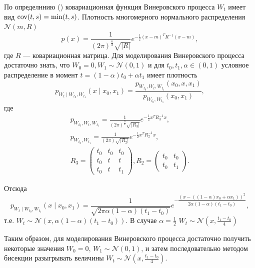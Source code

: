     По определннию (\cite{SAIM}) ковариационная функция Винеровского процесса 
    $W_t$ имеет вид $\operatorname{cov}(t,s) = \min (t,s)$. Плотность многомерного 
    нормального распределения $\mathcal{N}(m,R)$
    \begin{equation*}
        p(x) = \frac{1}{(2\pi)^
        {\frac{n}{2}}\sqrt{|R|}}e^ {-\frac{1}{2}(x-m)^T R^{-1}(x-m)},
    \end{equation*}
    где $R$ --- ковариационная матрица. Для моделирования Винеровского процесса 
    достаточно знать, что $W_0 = 0, W_1 \sim \mathcal{N}(0,1)$ и для $t_0, t_1, 
    \alpha \in (0,1)$ условное распределение в момент $t = (1-\alpha)t_0 + 
    \alpha t_1$ имеет плотность
    \begin{equation*}
        p_{W_t \mid W_{t_0},W_{t_1}} (x \mid x_0,x_1) = 
        \frac{p_{W_{t_0},W_t,W_{t_1}}(x_0,x,x_1)} {p_{W_{t_0},W_{t_1}}(x_0,x_1)},
	\end{equation*}
    где
    \begin{gather*}
        p_{W_{t_0},W_t,W_{t_1}} = \frac{1}{(2\pi)^{\frac{3}{2}}\sqrt{|R_3|}} 
        e^{-\frac{1}{2}x^T R_3^{-1} x},\\
        p_{W_{t_0},W_{t_1}} = 
        \frac{1}{(2\pi)\sqrt{|R_2|}} e^{-\frac{1}{2}x^T R_2^{-1} x},\\
        R_3 = \begin{pmatrix}
                t_0 & t_0 & t_0 \\
                t_0 & t & t \\
                t_0 & t & t_1
                \end{pmatrix} ,
        R_2 = \begin{pmatrix}
            t_0 & t_0 \\
            t_0 & t_1
            \end{pmatrix}.        
    \end{gather*}

    Отсюда
    \begin{equation*}
        p_{W_t \mid W_{t_0},W_{t_1}} (x \mid x_0,x_1) = 
        \frac{1}{\sqrt{2\pi\alpha(1-\alpha)(t_1-t_0)}} 
        e^{\displaystyle{-}
        \dfrac{(x-((1-\alpha)x_0+\alpha x_1))^2}{2\alpha(1-\alpha)(t_1-t_0)}},
    \end{equation*}
    т.е. $W_t \sim \mathcal{N}(x,\alpha(1-\alpha)(t_1 - t_0))$. В случае 
    $\alpha = \frac{1}{2}$ $W_t \sim \mathcal{N}(x,\frac{t_1-t_0}{4})$

    Таким образом, для моделирования Винеровского процесса достаточно получить 
    некоторые значения $W_0 = 0$, $W_1 \sim \mathcal{N}(0,1)$, и затем 
    последовательно методом бисекции разыгрывать величины $W_t \sim 
    \mathcal{N}(x,\frac{t_1-t_0}{4})$.

